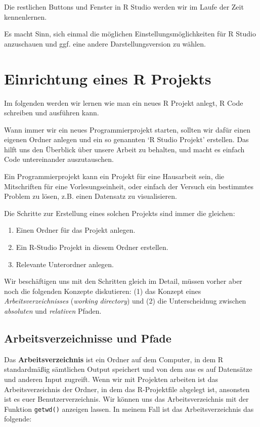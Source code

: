 \documentclass[]{tufte-book}
\providecommand{\tightlist}{%
  \setlength{\itemsep}{0pt}\setlength{\parskip}{0pt}}
\begin{document}
Die restlichen Buttons und Fenster in R Studio werden wir im Laufe der
Zeit kennenlernen.

Es macht Sinn, sich einmal die möglichen Einstellungsmöglichkeiten für R
Studio anzuschauen und ggf. eine andere Darstellungsversion zu wählen.

\section{Einrichtung eines R
Projekts}\label{einrichtung-eines-r-projekts}

Im folgenden werden wir lernen wie man ein neues R Projekt anlegt, R
Code schreiben und ausführen kann.

Wann immer wir ein neues Programmierprojekt starten, sollten wir dafür
einen eigenen Ordner anlegen und ein so genannten `R Studio Projekt'
erstellen. Das hilft uns den Überblick über unsere Arbeit zu behalten,
und macht es einfach Code untereinander auszutauschen.

Ein Programmierprojekt kann ein Projekt für eine Hausarbeit sein, die
Mitschriften für eine Vorlesungseinheit, oder einfach der Versuch ein
bestimmtes Problem zu lösen, z.B. einen Datensatz zu visualisieren.

Die Schritte zur Erstellung eines solchen Projekts sind immer die
gleichen:

\begin{enumerate}
\def\labelenumi{\arabic{enumi}.}
\tightlist
\item
  Einen Ordner für das Projekt anlegen.
\item
  Ein R-Studio Projekt in diesem Ordner erstellen.
\item
  Relevante Unterordner anlegen.
\end{enumerate}

Wir beschäftigen uns mit den Schritten gleich im Detail, müssen vorher
aber noch die folgenden Konzepte diskutieren: (1) das Konzept eines
\emph{Arbeitsverzeichnisses} (\emph{working directory}) und (2) die
Unterscheidnug zwischen \emph{absoluten} und \emph{relativen} Pfaden.

\subsection{Arbeitsverzeichnisse und
Pfade}\label{arbeitsverzeichnisse-und-pfade}

Das \textbf{Arbeitsverzeichnis} ist ein Ordner auf dem Computer, in dem
R standardmäßig sämtlichen Output speichert und von dem aus es auf
Datensätze und anderen Input zugreift. Wenn wir mit Projekten arbeiten
ist das Arbeitsverzeichnis der Ordner, in dem das R-Projektfile abgelegt
ist, ansonsten ist es euer Benutzerverzeichnis. Wir können uns das
Arbeitsverzeichnis mit der Funktion \texttt{getwd()} anzeigen lassen. In
meinem Fall ist das Arbeitsverzeichnis das folgende:
\end{document}

